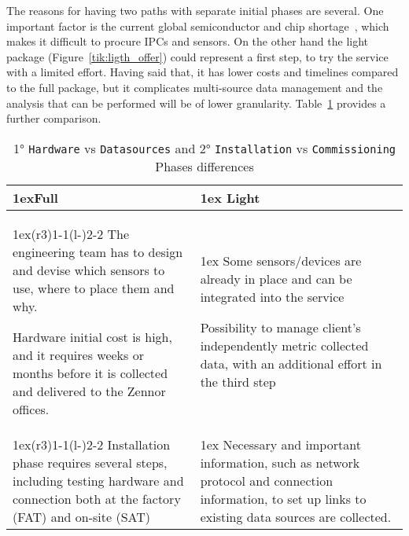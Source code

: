 The reasons for having two paths with separate initial phases are several. One important factor is the current global semiconductor and chip shortage~\cite{Article:bbcnews_2021_chip},
 which makes it difficult to procure \ac{IPCs} and sensors.
On the other hand the light package (Figure~\ref{tik:ligth_offer}) could represent a first step, to try the service with a limited effort.
Having said that, it has lower costs and timelines compared to the full package, but it complicates multi-source data management and the analysis that can be performed will be of lower granularity.
Table~\ref*{tab:phase_diff} provides a further comparison.
\begin{table}[ht]
	\begin{tabularx}{\textwidth}{>{\parskip1ex}X@{\kern4\tabcolsep}>{\parskip1ex}X}
		\toprule
		\hfil\bfseries Full
		 &
		\hfil\bfseries Light
		\\\cmidrule(r{3\tabcolsep}){1-1}\cmidrule(l{-\tabcolsep}){2-2}
		The engineering team has to design and devise which sensors to use, where to place them and why.\par
		Hardware initial cost is high, and it requires weeks or months before it is collected and delivered to the Zennor offices.\par
		 &
		Some sensors/devices are already in place and can be integrated into the service\par
		Possibility to manage client's independently metric collected data, with an additional effort in the third step\par
		\\\cmidrule(r{3\tabcolsep}){1-1}\cmidrule(l{-\tabcolsep}){2-2}
		Installation phase requires several steps, including testing hardware and connection both at the factory (FAT) and on-site (SAT)\par
		 &
		Necessary and important information, such as network protocol and connection information, to set up links to existing data sources are collected.\par
		\\\bottomrule
	\end{tabularx}
	\caption[1° and 2° Phases differences of Zensor's Approach]{1° \texttt{Hardware} vs \texttt{Datasources} and 2° \texttt{Installation} vs \texttt{Commissioning} Phases differences}
	\label{tab:phase_diff}
\end{table}

